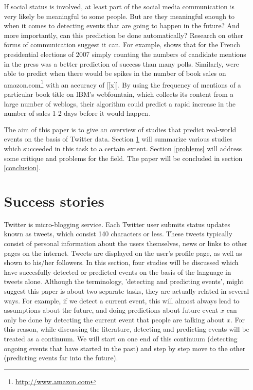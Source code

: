 \documentclass[12pt]{article}
\begin{document}

If social status is involved, at least part of the social media communication is very likely be meaningful to some people. But are they meaningful enough to when it comes to detecting events that are going to happen in the future? And more importantly, can this prediction be done automatically? Research on other forms of communication suggest it can. For example,  shows that for the French presidential elections of 2007 simply counting the numbers of candidate mentions in the press was a better prediction of success than many polls. Similarly,  were able to predict when there would be spikes in the number of book sales on amazon.com\footnote{\url{http://www.amazon.com}} with an accuracy of [[x]]. By using the frequency of mentions of a particular book title on IBM's webfountain, which collects its content from a large number of weblogs, their algorithm could predict a rapid increase in the number of sales 1-2 days before it would happen.


The aim of this paper is to give an overview of studies that predict real-world events on the basis of Twitter data. Section \ref{success} will summarize various studies which succeeded in this task to a certain extent. Section \ref{problems} will address some critique and problems for the field. The paper will be concluded in section \ref{conclusion}.

\section{Success stories} \label{success}

Twitter is micro-blogging service. Each Twitter user submits status updates known as tweets, which consist 140 characters or less. These tweets typically consist of personal information about the users themselves, news or links to other pages on the internet. Tweets are displayed on the user’s profile page, as well as shown to his/her followers. In this section, four studies will be discussed which have succesfully detected or predicted events on the basis of the language in tweets alone. Although the terminology, 'detecting and predicting events', might suggest this paper is about two separate tasks, they are actually related in several ways. For example, if we detect a current event, this will almost always lead to assumptions about the future, and doing predictions about future event $x$ can only be done by detecting the current event that people are talking about $x$. For this reason, while discussing the literature, detecting and predicting events will be treated as a continuum. We will start on one end of this continuum (detecting ongoing events that have started in the past) and step by step move to the other (predicting events far into the future).
\end{document}

